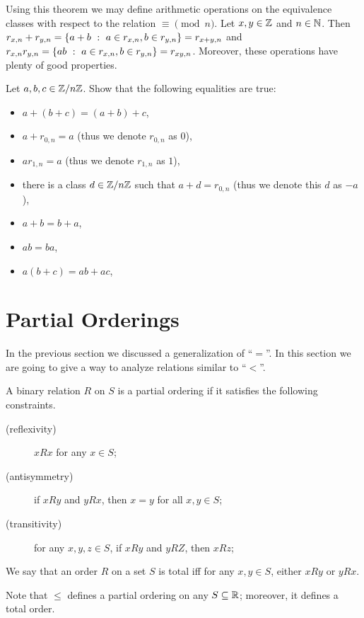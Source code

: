 Using this theorem we may define arithmetic operations on the equivalence
classes with respect to the relation $\equiv \pmod{n}$.
Let $x, y \in \mathbb{Z}$ and $n \in \mathbb{N}$. Then
$r_{x, n} + r_{y, n} = \set[a \in r_{x, n}, b \in r_{y, n}]{a + b} =
r_{x + y, n}$ and
$r_{x, n} r_{y, n} = \set[a \in r_{x, n}, b \in r_{y, n}]{ab} = r_{xy, n}$.
Moreover, these operations have plenty of good properties.
\begin{exercise}
  Let $a, b, c \in \mathbb{Z} / n\mathbb{Z}$.
  Show that the following equalities are true:
  \begin{itemize}
    \item $a + (b + c) = (a + b) + c$,
    \item $a + r_{0, n} = a$ (thus we denote $r_{0, n}$ as $0$),
    \item $a r_{1, n} = a$ (thus we denote $r_{1, n}$ as $1$),
    \item there is a class $d \in \mathbb{Z} / n\mathbb{Z}$ such that $a + d = r_{0, n}$
      (thus we denote this $d$ as $-a$),
    \item $a + b = b + a$,
    \item $ab = ba$,
    \item $a(b + c) = ab + ac$,
  \end{itemize}
\end{exercise}

\section{Partial Orderings}
In the previous section we discussed a generalization of ``$=$''.
In this section we are going to give a way to analyze relations similar to
``$<$''.

\begin{definition}
  A binary relation $R$ on $S$ is a partial ordering if it satisfies the
  following constraints.
  \begin{description}
    \item[(reflexivity)]  $x R x$ for any $x \in S$;
    \item[(antisymmetry)] if $x R y$ and $y R x$, then $x = y$ for all
      $x, y \in S$;
    \item[(transitivity)] for any $x, y, z \in S$, if $x R y$ and $y R Z$, then
      $x R z$;
  \end{description}

  We say that an order $R$ on a set $S$ is total iff for any $x, y \in S$,
  either $x R y$ or $y R x$.
\end{definition}
\noindent Note that $\le$ defines a partial ordering on any $S \subseteq \mathbb{R}$;
moreover, it defines a total order.

